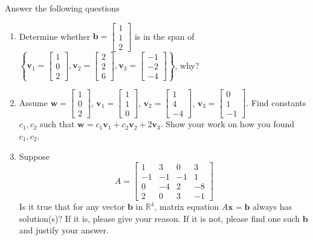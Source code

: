 \documentclass[a4paper,10pt]{article}
\begin{document}
\begin{problem}
Answer the following questions
\begin{enumerate}
\item Determine whether $\mathbf b=\begin{bmatrix}1\\1\\2\end{bmatrix}$ is in the span of $\left\{\mathbf v_1=\begin{bmatrix}1\\0\\2\end{bmatrix},\mathbf v_2=\begin{bmatrix}2\\2\\6\end{bmatrix},\mathbf v_3=\begin{bmatrix}-1\\-2\\-4\end{bmatrix}\right\}$, why?
\item Assume $\mathbf w=\begin{bmatrix}1\\0\\2\end{bmatrix}$, $\mathbf v_1=\begin{bmatrix}1\\1\\0\end{bmatrix}$, $\mathbf v_2=\begin{bmatrix}1\\4\\-4\end{bmatrix}$, $\mathbf v_3=\begin{bmatrix}0\\1\\-1\end{bmatrix}$. Find constants $c_1,c_2$ such that $\mathbf w=c_1\mathbf v_1+c_2\mathbf v_2+2\mathbf v_3$. Show your work on how you found $c_1,c_2$.
\item Suppose 
\[
A=\begin{bmatrix}
1   &  3    & 0&     3\\
-1   & -1  &  -1 &    1\\
0    &-4  &   2   & -8\\
2     &0&     3   & -1
\end{bmatrix}
\]
Is it true that for any vector $\mathbf b$ in $\mathbb R^4$, matrix equation $A\mathbf x=\mathbf b$ always has solution(s)? If it is, please give your reason. If it is not, please find one such $\mathbf b$ and justify your answer.
\end{enumerate}
\end{problem}
\end{document}
